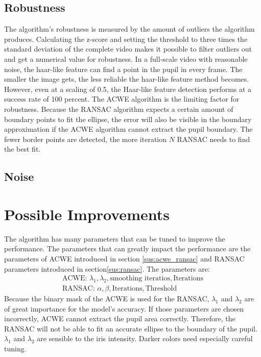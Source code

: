 \subsection{Robustness}
The algorithm's robustness is measured by the amount of outliers the algorithm produces. Calculating the z-score and setting the threshold to three times the standard deviation of the complete video makes it possible to filter outliers out and get a numerical value for robustness. In a full-scale video with reasonable noise, the haar-like feature can find a point in the pupil in every frame. The smaller the image gets, the less reliable the haar-like feature method becomes. However, even at a scaling of 0.5, the Haar-like feature detection performs at a success rate of 100 percent. The ACWE algorithm is the limiting factor for robustness. Because the RANSAC algorithm expects a certain amount of boundary points to fit the ellipse, the error will also be visible in the boundary approximation if the ACWE algorithm cannot extract the pupil boundary. The fewer border points are detected, the more iteration $N$ RANSAC needs to find the best fit. 
\subsection{Noise}

\section{Possible Improvements}
The algorithm has many parameters that can be tuned to improve the performance. The parameters that can greatly impact the performance are the parameters of ACWE introduced in section \ref{sus:acwe_ransac} and RANSAC parameters introduced in section\ref{sus:ransac}. The parameters are:
\begin{gather*}
    \text{ACWE: } \lambda_1, \lambda_2,\text{smoothing iteratios}, \text{Iterations}\\
    \text{RANSAC: } \alpha, \beta, \text{Iterations}, \text{Threshold}
\end{gather*}
Because the binary mask of the ACWE is used for the RANSAC, $\lambda_1$ and $\lambda_2$ are of great importance for the model's accuracy. If those parameters are chosen incorrectly, ACWE cannot extract the pupil area correctly. Therefore, the RANSAC will not be able to fit an accurate ellipse to the boundary of the pupil. $\lambda_1$ and $\lambda_2$ are sensible to the iris intensity. Darker colors need especially careful tuning. 

